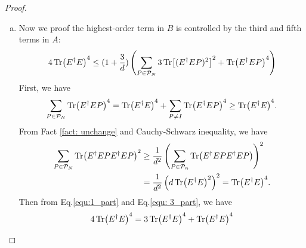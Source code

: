 \documentclass[showpacs,amsmath,amssymb,twocolumn,aps,pra,superscriptaddress,notitlepage,10pt]{revtex4-2}
\newcommand{\cP}{\mathcal P}
\begin{document}
\begin{proof}
\begin{enumerate}[(a)]
\begin{align}
            &=\Theta(m^2)I+\sum\beta_jP_{\beta_j}+\sum\gamma_kP_{\gamma_k},n\rightarrow \infty
        \end{align}
        so
        \begin{align}
            \Tr[(E^\dagger E)^2]=\Theta(m^2)d=\mathrm{poly}(N) 2^N,N\rightarrow\infty
        \end{align}
        Here each $\beta_j=\Theta(N^2)$ and there are $\mathcal O(N^2)$ terms in total. Each $\gamma_k=\Theta(1)$ and there are $\mathcal O(N^4)$ terms in total. Similarly, one can find that
        \begin{align}
            \Tr[(E^\dagger E)^3]&=\text{poly}(N)2^N\\
            \Tr[(E^\dagger E)^4]&=\text{poly}(N)2^N
        \end{align}
       Therefore, we establish that the terms in Eq.\eqref{equ:B} exhibit asymptotic orders of $\text{poly}(N)d$, $\text{poly}(N)d^2$,$\Theta(N^4d^2)$, $\Theta(N^4d^3)$, $\Theta(n^4d^4)$ respectively. Consequently, the highest-order term $\Tr(E^\dagger E)^4$ dominates the asymptotic behavior.
\item Now we proof the highest-order term in $B$ is controlled by the third and fifth terms in $A$:$$4\Tr(E^\dagger E)^4\leq (1+\frac{3}{d})\left(\sum_{P\in\mathcal P_N}3\Tr[(E^\dagger EP)^2]^2+\Tr(E^\dagger EP)^4\right)$$
        First, we have
        \begin{equation}
            \sum_{P\in\mathcal P_N}\Tr(E^\dagger EP)^4=\Tr(E^\dagger E)^4+ \sum_{P\neq I}\Tr(E^\dagger EP)^4\geq\Tr(E^\dagger E)^4.\label{equ:1_part}
        \end{equation}
        From Fact \ref{fact: unchange} and Cauchy-Schwarz inequality, we have
        \begin{equation}
        \begin{aligned}\label{equ: 3_part}
            \sum_{P\in\mathcal P_N}\Tr(E^\dagger EPE^\dagger EP)^2&\ge\frac{1}{d^2}\left(\sum_{P\in\cP_n}\Tr(E^\dagger EPE^\dagger EP)\right)^2\\
            &=\frac{1}{d^2}\left(d\Tr(E^\dagger E)^2\right)^2=\Tr(E^\dagger E)^4.
        \end{aligned}
        \end{equation}
        Then from Eq.\eqref{equ:1_part} and Eq.\eqref{equ: 3_part}, we have
        \begin{equation}
            \begin{aligned}
                4\Tr(E^\dagger E)^4&=3\Tr(E^\dagger E)^4+\Tr(E^\dagger E)^4\\

\end{aligned}
\end{equation}
\end{enumerate}
\end{proof}
\end{document}
